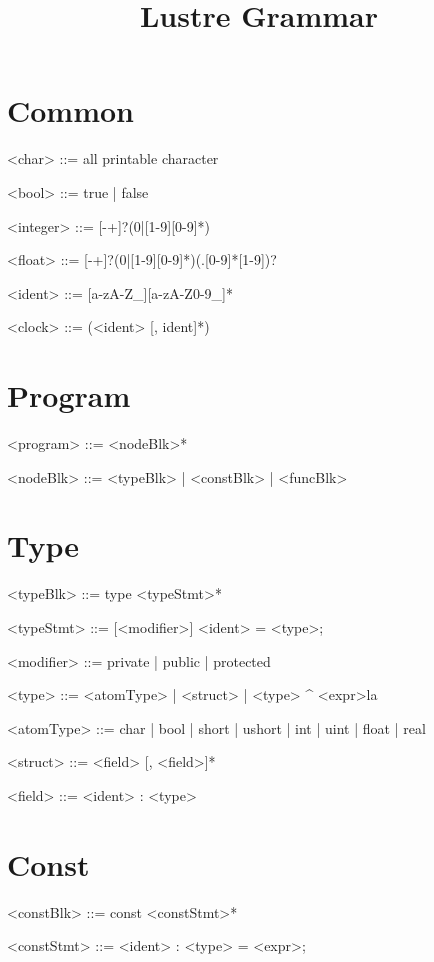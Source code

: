 \documentclass{article}
\title{\bf Lustre Grammar}
\begin{document}
\maketitle

\section{Common}
\begin{grammar} \small

<char> ::= all printable character

<bool> ::= true | false

<integer> ::= [-+]?(0|[1-9][0-9]*)

<float> ::= [-+]?(0|[1-9][0-9]*)(.[0-9]*[1-9])?

<ident> ::= [a-zA-Z_][a-zA-Z0-9_]*

<clock> ::= (<ident> [, ident]*)

\end{grammar}

\section{Program}
\begin{grammar}

<program> ::= <nodeBlk>*

<nodeBlk> ::= <typeBlk> | <constBlk> | <funcBlk>

\end{grammar}

\section{Type}
\begin{grammar}

<typeBlk> ::= type <typeStmt>*

<typeStmt> ::= [<modifier>] <ident> = <type>;

<modifier> ::= private | public | protected

<type> ::= <atomType> |  <struct> | <type> \^{} <expr>la

<atomType> ::= char | bool | short | ushort | int | uint | float | real

<struct> ::= {<field> [, <field>]*}

<field> ::= <ident> : <type>

\end{grammar}

\section{Const}
\begin{grammar}

<constBlk> ::= const <constStmt>*

<constStmt> ::= <ident> : <type> = <expr>;


\end{grammar}
\end{document}
